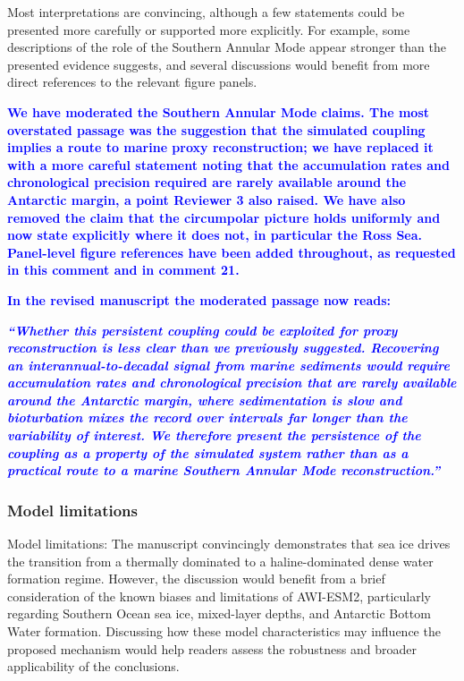 \documentclass[pdflatex,sn-nature]{sn-jnl}
\begin{document}
\medskip
\noindent Most interpretations are convincing, although a few statements could be presented more carefully or supported more explicitly. For example, some descriptions of the role of the Southern Annular Mode appear stronger than the presented evidence suggests, and several discussions would benefit from more direct references to the relevant figure panels.
\medskip

\noindent\textcolor{blue}{\textbf{We have moderated the Southern Annular Mode claims. The most overstated passage was the suggestion that the simulated coupling implies a route to marine proxy reconstruction; we have replaced it with a more careful statement noting that the accumulation rates and chronological precision required are rarely available around the Antarctic margin, a point Reviewer 3 also raised. We have also removed the claim that the circumpolar picture holds uniformly and now state explicitly where it does not, in particular the Ross Sea. Panel-level figure references have been added throughout, as requested in this comment and in comment 21.}}


\noindent\textcolor{blue}{\textbf{In the revised manuscript the moderated passage now reads:}}


\medskip
\noindent\textcolor{blue}{\textbf{\textit{``Whether this persistent coupling could be exploited for proxy reconstruction is less clear than we previously suggested. Recovering an interannual-to-decadal signal from marine sediments would require accumulation rates and chronological precision that are rarely available around the Antarctic margin, where sedimentation is slow and bioturbation mixes the record over intervals far longer than the variability of interest. We therefore present the persistence of the coupling as a property of the simulated system rather than as a practical route to a marine Southern Annular Mode reconstruction.''}}}
\medskip

\subsubsection*{Model limitations}

\medskip
\noindent Model limitations: The manuscript convincingly demonstrates that sea ice drives the transition from a thermally dominated to a haline-dominated dense water formation regime. However, the discussion would benefit from a brief consideration of the known biases and limitations of AWI-ESM2, particularly regarding Southern Ocean sea ice, mixed-layer depths, and Antarctic Bottom Water formation. Discussing how these model characteristics may influence the proposed mechanism would help readers assess the robustness and broader applicability of the conclusions.
\medskip
\end{document}
